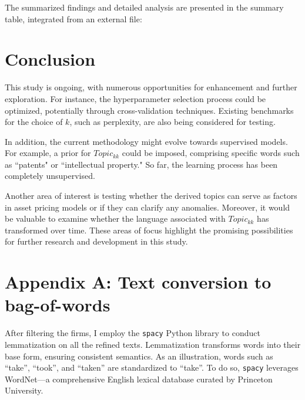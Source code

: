 \documentclass[12pt, letterpaper]{article}
\begin{document}
The summarized findings and detailed analysis are presented in the summary table, integrated from an external file:




\section{Conclusion}

This study is ongoing, with numerous opportunities for enhancement and further exploration. For instance, the hyperparameter selection process could be optimized, potentially through cross-validation techniques. Existing benchmarks for the choice of $k$, such as perplexity, are also being considered for testing.

In addition, the current methodology might evolve towards supervised models. For example, a prior for $Topic_{kk}$ could be imposed, comprising specific words such as ``patents" or ``intellectual property." So far, the learning process has been completely unsupervised.

Another area of interest is testing whether the derived topics can serve as factors in asset pricing models or if they can clarify any anomalies. Moreover, it would be valuable to examine whether the language associated with $Topic_{kk}$ has transformed over time. These areas of focus highlight the promising possibilities for further research and development in this study.

%
%
%
%
%



\section*{Appendix A: Text conversion to bag-of-words}
\label{bow}

After filtering the firms, I employ the \texttt{spacy} Python library to conduct lemmatization on all the refined texts. Lemmatization transforms words into their base form, ensuring consistent semantics. As an illustration, words such as ``take'', ``took'', and ``taken'' are standardized to ``take''. To do so, \texttt{spacy} leverages WordNet---a comprehensive English lexical database curated by Princeton University.
\end{document}
